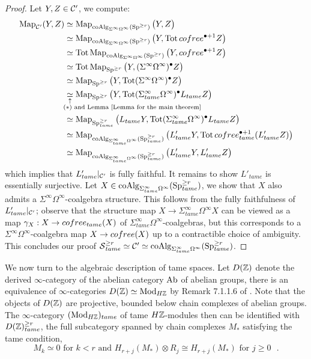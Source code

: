 \begin{proof}
Let $Y,Z\in {\mathcal{C}}'$, we compute:
\[
\begin{aligned}
	\map_{\CC'}(Y,Z) & \simeq \map_{\coAlg_{\Sigma^{\infty}\Omega^{\infty}}(\Sp^{\geq r})}\big(Y,Z\big) \\
	& \simeq \map_{\coAlg_{\Sigma^{\infty}\Omega^{\infty}}(\Sp^{\geq r})}\big(Y,\Tot \cofree^{\bullet+1} Z\big)\\
	& \simeq \Tot \map_{\coAlg_{\Sigma^{\infty}\Omega^{\infty}}(\Sp^{\geq r})}\big(Y, \cofree^{\bullet+1} Z\big)\\
	& \simeq \Tot \map_{\Sp^{\geq r}}\big(Y, (\Sigma^{\infty}\Omega^{\infty})^{\bullet} Z\big)\\
	& \simeq  \map_{\Sp^{\geq r}}\big(Y, \Tot (\Sigma^{\infty}\Omega^{\infty})^{\bullet} Z\big)\\
	& \simeqexpl{$(\ast)$ and Lemma \ref{Lemma for the main theorem}}  \map_{\Sp^{\geq r}}\big(Y, \Tot (\Sigma^{\infty}_{tame}\Omega^{\infty})^{\bullet} L_{tame} Z\big)\\
	& \simeq  \map_{\Sp^{\geq r}_{tame}}\big(L_{tame}Y, \Tot (\Sigma^{\infty}_{tame}\Omega^{\infty})^{\bullet} L_{tame} Z\big)\\
	& \simeq \map_{\coAlg_{\Sigma^{\infty}_{tame}\Omega^{\infty}}(\Sp^{\geq r}_{tame})}\big(L'_{tame}Y,\Tot \cofree^{\bullet+1}_{tame} (L'_{tame}Z)\big)\\
	& \simeq \map_{\coAlg_{\Sigma^{\infty}_{tame}\Omega^{\infty}}(\Sp^{\geq r}_{tame})}\big(L'_{tame}Y,L'_{tame}Z \big)
\end{aligned}
\]
which implies that $L'_{tame}|_{{\mathcal{C}}'}$ is fully faithful. It remains to show $L'_{tame}$ is essentially surjective. Let $X\in \operatorname{coAlg}_{\Sigma^{\infty}_{tame}\Omega^{\infty}} (\operatorname{Sp}_{tame}^{\geq r})$, we show that $X$ also admits a $\Sigma^{\infty}\Omega^{\infty}$-coalgebra structure. 
This follows from the fully faithfulness of $L'_{tame}|_{{\mathcal{C}}'}$; observe that the structure map $X\to \Sigma^{\infty}_{tame}\Omega^{\infty}X$ can be viewed as a map $\gamma_X:X \to cofree_{tame}(X)$ of $\Sigma^{\infty}_{tame}\Omega^{\infty}$-coalgebras, but this corresponds to a $\Sigma^{\infty}\Omega^{\infty}$-coalgebra map $X \to cofree (X)$ up to a contractible choice of ambiguity. 
This concludes our proof $\operatorname{\mathcal{S}}^{\geq r}_{tame}\simeq {\mathcal{C}}'\simeq \operatorname{coAlg}_{\Sigma^{\infty}_{tame}\Omega^{\infty}}(\operatorname{Sp}_{tame}^{\geq r})$.
\end{proof}

We now turn to the algebraic description of tame spaces. 
Let $D({\mathbb{Z}})$ denote the derived $\infty$-category of the abelian category $\operatorname{Ab}$ of abelian groups, there is an equivalence of $\infty$-categories $D({\mathbb{Z}})\simeq \operatorname{Mod}_{H{\mathbb{Z}}}$ by Remark 7.1.1.6 of \cite{HA}. Note that the objects of $D({\mathbb{Z}})$ are projective, bounded below chain complexes of abelian groups.
The $\infty$-category $(\operatorname{Mod}_{H{\mathbb{Z}}})_{tame}$ of tame $H{\mathbb{Z}}$-modules then can be identified with $D({\mathbb{Z}})_{tame}^{\geq r}$, the full subcategory spanned by chain complexes $M_{*}$ satisfying the tame condition,
$$
M_{k}\simeq 0 \text{ for $k<r$ and } H_{r+j}(M_{*})\otimes R_{j}\cong H_{r+j}(M_{*}) \text{ for $j\geq 0$ }.
$$

